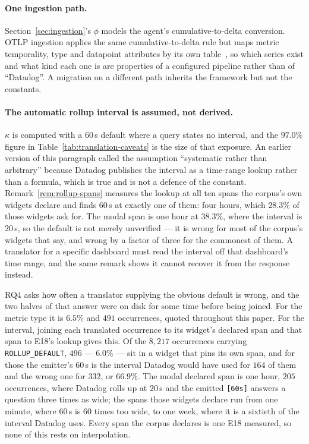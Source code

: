 \paragraph{One ingestion path.}
Section~\ref{sec:ingestion}'s $\phi$ models the agent's cumulative-to-delta conversion.
OTLP ingestion applies the same cumulative-to-delta rule but maps metric temporality,
type and datapoint attributes by its own table~\citep{ddotlp}, so which series exist
and what kind each one is are properties of a configured pipeline rather than of
``Datadog''. A migration on a different path inherits the framework but not the constants.

\paragraph{The automatic rollup interval is assumed, not derived.}
$\kappa$ is computed with a $60$\,s default where a query states no interval, and the
$97.0\%$ figure in Table~\ref{tab:translation-caveats} is the size of that exposure. An
earlier version of this paragraph called the assumption ``systematic rather than
arbitrary'' because Datadog publishes the interval as a time-range lookup rather than a
formula, which is true and is not a defence of the constant.
Remark~\ref{rem:rollup-spans} measures the lookup at all ten spans the corpus's own
widgets declare and finds $60$\,s at exactly one of them: four hours, which $28.3\%$ of
those widgets ask for. The modal span is one hour at $38.3\%$, where the interval is
$20$\,s, so the default is not merely unverified --- it is wrong for most of the corpus's
widgets that say, and wrong by a factor of three for the commonest of them. A translator
for a specific dashboard must read the interval off that dashboard's time range, and the
same remark shows it cannot recover it from the response instead.

RQ4 asks how often a translator supplying the obvious default is wrong, and the two
halves of that answer were on disk for some time before being joined. For the metric
type it is $6.5\%$ and $491$ occurrences, quoted throughout this paper. For the
interval, joining each translated occurrence to its widget's declared span and that span
to E18's lookup gives this. Of the $8{,}217$ occurrences carrying
\texttt{ROLLUP\_DEFAULT}, $496$ --- $6.0\%$ --- sit in a widget that pins its own span,
and for those the emitter's $60$\,s is the interval Datadog would have used for $164$ of
them and the wrong one for $332$, or $66.9\%$. The modal declared span is one hour,
$205$ occurrences, where Datadog rolls up at $20$\,s and the emitted \texttt{[60s]}
answers a question three times as wide; the spans those widgets declare run from one
minute, where $60$\,s is $60$ times too wide, to one week, where it is a sixtieth of the
interval Datadog uses. Every span the corpus declares is one E18 measured, so none of
this rests on interpolation.

